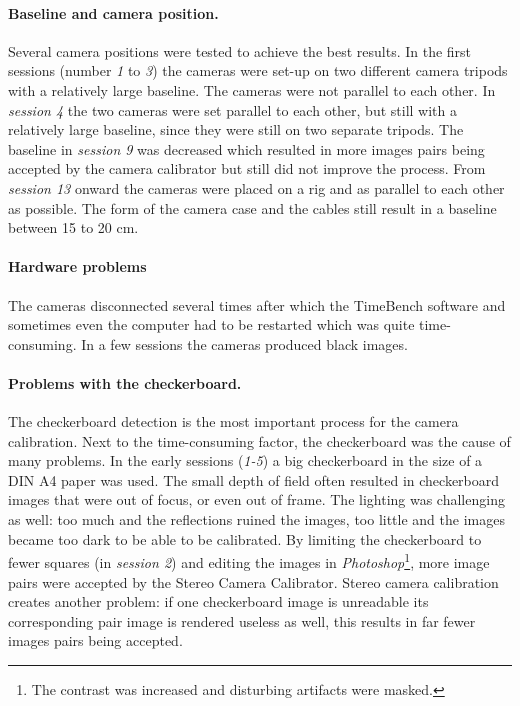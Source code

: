 \paragraph{Baseline and camera position.}
Several camera positions were tested to achieve the best results. In the first sessions (number \textit{1} to \textit{3}) the cameras were set-up on two different camera tripods with a relatively large baseline. The cameras were not parallel to each other. In \textit{session 4} the two cameras were set parallel to each other, but still with a relatively large baseline, since they were still on two separate tripods. The baseline in \textit{session 9} was decreased which resulted in more images pairs being accepted by the camera calibrator but still did not improve the process. From \textit{session 13} onward the cameras were placed on a rig and as parallel to each other as possible. The form of the camera case and the cables still result in a baseline between 15 to 20 cm.

\paragraph{Hardware problems}
The cameras disconnected several times after which the TimeBench software and sometimes even the computer had to be restarted which was quite time-consuming. In a few sessions the cameras produced black images.

\paragraph{Problems with the checkerboard.}
The checkerboard detection is the most important process for the camera calibration. Next to the time-consuming factor, the checkerboard was the cause of many problems. In the early sessions (\textit{1-5}) a big checkerboard in the size of a DIN A4 paper was used. The small depth of field often resulted in checkerboard images that were out of focus, or even out of frame. The lighting was challenging as well: too much and the reflections ruined the images, too little and the images became too dark to be able to be calibrated. By limiting the checkerboard to fewer squares (in \textit{session 2}) and editing the images in \textit{Photoshop}\footnote{The contrast was increased and disturbing artifacts were masked.}, more image pairs were accepted by the Stereo Camera Calibrator. Stereo camera calibration creates another problem: if one checkerboard image is unreadable its corresponding pair image is rendered useless as well, this results in far fewer images pairs being accepted.

